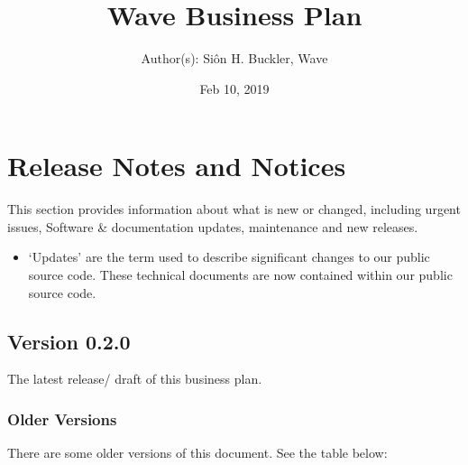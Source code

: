\documentclass[letterpaper,10pt,openany,oneside,english]{sphinxmanual}
\title{Wave Business Plan}
\date{Feb 10, 2019}
\author{Author(s): Siôn H. Buckler, Wave}
\begin{document}
\maketitle
\sphinxtableofcontents
{}\label{\detokenize{index::doc}}


\noindent{}


\chapter{Release Notes and Notices}
\label{\detokenize{releasenotes:release-notes-and-notices}}\label{\detokenize{releasenotes::doc}}
This section provides information about what is new or changed, including urgent issues, Software \& documentation updates, maintenance and new releases.
\begin{itemize}
\item {} 
‘Updates’ are the term used to describe significant changes to our public source code. These technical documents are now contained within our public source code.

\end{itemize}


\section{Version 0.2.0}
\label{\detokenize{releasenotes:version-0-2-0}}
The latest release/ draft of this business plan.


\subsection{Older Versions}
\label{\detokenize{releasenotes:older-versions}}
There are some older versions of this document. See the table below:
\end{document}
